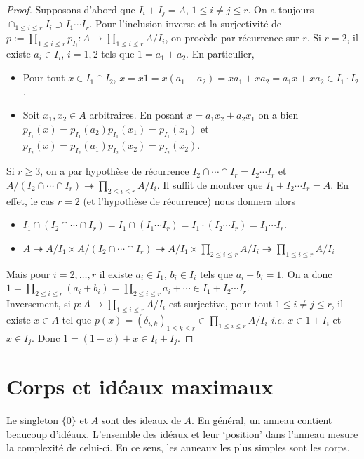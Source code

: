 \documentclass[a4paper, oneside, 12pt]{book}
\theoremstyle{theoremeStyle} %
\theoremstyle{definition} %
\newcommand{\ie}{\textit{i.e.}} %
\begin{document}
   \begin{proof} Supposons d'abord que $I_i+I_j=A$, $1\leq i\not=j\leq r$.  On a toujours $\cap_{1\leq i\leq r}I_i\supset I_1\cdots I_r$. Pour l'inclusion inverse et la surjectivité de  $p:=\prod_{1\leq i\leq r}p_{I_i}:A\rightarrow \prod_{1\leq i\leq r}A/I_i$, on procède par récurrence sur $r$. Si $r=2$, il existe $a_i\in I_i$, $i=1,2$ tels que $1=a_1+ a_2$. En particulier,
   \begin{itemize}[leftmargin=* ,parsep=0cm,itemsep=0cm,topsep=0cm]
   \item  Pour tout $x\in I_1\cap I_2$, $x=x 1=x  (a_1+ a_2)=xa_1+xa_2=a_1x+xa_2\in I_1\cdot I_2$.
   \item Soit $x_1,x_2\in A$ arbitraires. En posant $x=a_1x_2+a_2x_1$ on a bien $p_{I_1}(x)=p_{I_1}(a_2)p_{I_1}(x_1)= p_{I_1}(x_1)$ et $p_{I_2}(x)=p_{I_2}(a_1)p_{I_2}(x_2)= p_{I_2}(x_2)$.
   \end{itemize}
  Si $r\geq 3$,  on a par hypothèse de récurrence $I_2\cap\cdots \cap I_{r }=I_2\cdots I_{r}$ et   $A/(I_2\cap \cdots\cap I_r)\twoheadrightarrow \prod_{2\leq i\leq r}A/I_i$. Il suffit de montrer que $I_1+I_2\cdots I_r=A$. En effet, le cas $r=2$ (et l'hypothèse de récurrence) nous donnera alors
     \begin{itemize}
   \item  $I_1\cap (I_2\cap\cdots \cap I_{r })=I_1\cap (I_1\cdots I_r)=I_1\cdot (I_2\cdots I_r)= I_1\cdots I_r$.
   \item $A\twoheadrightarrow A/I_1\times A/(I_2\cap\cdots\cap  I_r)\twoheadrightarrow A/I_1\times\prod_{2\leq i\leq r}A/I_i\twoheadrightarrow  \prod_{1\leq i\leq r}A/I_i$
   \end{itemize}
    Mais pour $i=2,\dots, r$ il existe $a_i\in I_1$, $b_i\in I_i$ tels que $a_i+b_i=1$. On a donc $1=\prod_{2\leq i\leq r}(a_i+b_i)=\prod_{2\leq i\leq r}a_i+\cdots\in I_1+I_2\cdots I_r$.\\
     Inversement, si $p :A\rightarrow \prod_{1\leq i\leq r}A/I_i$ est surjective, pour tout $1\leq i\not=j\leq r$, il existe $x\in A$ tel que $p(x)=(\delta_{i,k})_{1\leq k\leq r}\in \prod_{1\leq i\leq r}A/I_i$ \ie{} $x\in 1+I_i$ et $x\in I_j$. Donc $1=(1-x)+x\in I_i+I_j$. \end{proof}



\section{Corps et idéaux maximaux} \label{Corps}Le singleton $\lbrace 0\rbrace$ et $A$ sont des ideaux de $A$. En général, un anneau contient beaucoup d'idéaux. L'ensemble des idéaux et leur `position' dans l'anneau mesure la complexité de celui-ci.  En ce sens, les anneaux les plus simples sont les corps. \\
\end{document}
